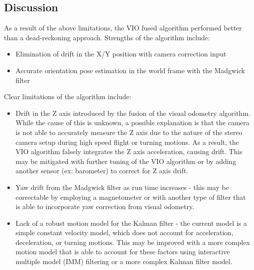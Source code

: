 \documentclass[bare_jrnl_transmag]{subfiles}
\begin{document}
\subsection{Discussion}
As a result of the above limitations, the VIO fused algorithm performed better than a dead-reckoning approach. Strengths of the algorithm include:
\begin{itemize}
    \item Elimination of drift in the X/Y position with camera correction input
    \item Accurate orientation pose estimation in the world frame with the Madgwick filter 
\end{itemize}

Clear limitations of the algorithm include:
\begin{itemize}
    \item Drift in the Z axis introduced by the fusion of the visual odometry algorithm. While the cause of this is unknown, a possible explanation is that the camera is not able to accurately measure the Z axis due to the nature of the stereo camera setup during high speed flight or turning motions. As a result, the VIO algorithm falsely integrates the Z axis acceleration, causing drift. This may be mitigated with further tuning of the VIO algorithm or by adding another sensor (ex: barometer) to correct for Z axis drift.
    \item Yaw drift from the Madgwick filter as run time increases - this may be correctable by employing a magnetometer or with another type of filter that is able to incorporate yaw correction from visual odometry. 
    \item Lack of a robust motion model for the Kalman filter - the current model is a simple constant velocity model, which does not account for acceleration, deceleration, or turning motions. This may be improved with a more complex motion model that is able to account for these factors using interactive multiple model (IMM) filtering or a more complex Kalman filter model.
\end{itemize}
\end{document}
